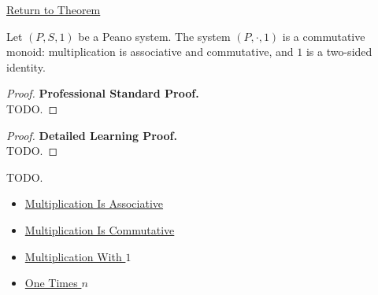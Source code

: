\newpage
{}
\label{prf:n-multiplicative-monoid}

\begin{remark*}[Return]
\hyperref[thm:n-multiplicative-monoid]{Return to Theorem}
\end{remark*}

\begin{theorem*}
Let $(P,S,1)$ be a Peano system. The system $(P,\cdot,1)$ is a commutative
monoid: multiplication is associative and commutative, and $1$ is a
two-sided identity.
\end{theorem*}

\begin{proof}
\textbf{Professional Standard Proof.}~\\
TODO.
\end{proof}

\begin{proof}
\textbf{Detailed Learning Proof.}~\\
TODO.
\end{proof}

\begin{remark*}
TODO.
\end{remark*}

\begin{dependencies}
\begin{itemize}
  \item \hyperref[thm:multiplication-associative]{Multiplication Is Associative}
  \item \hyperref[thm:multiplication-commutative]{Multiplication Is Commutative}
  \item \hyperref[thm:multiplication-with-one]{Multiplication With $1$}
  \item \hyperref[thm:one-times-n]{One Times $n$}
\end{itemize}
\end{dependencies}
